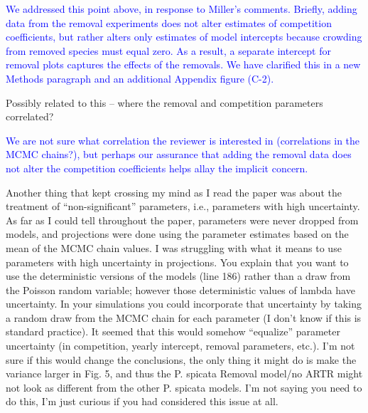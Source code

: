 \documentclass[12pt]{article}
\newcommand{\response}{\textcolor{blue}}
\begin{document}
\response{We addressed this point above, in response to Miller's comments. Briefly, adding data from the removal experiments does not alter estimates of competition coefficients, but rather alters only estimates of model intercepts because crowding from removed species must equal zero. As a result, a separate intercept for removal plots captures the effects of the removals. We have clarified this in a new Methods paragraph and an additional Appendix figure (C-2).}

Possibly related to this – where the removal and competition parameters correlated?

\response{We are not sure what correlation the reviewer is interested in 
(correlations in the MCMC chains?), but perhaps our assurance that
adding the removal data does not alter the competition coefficients 
helps allay the implicit concern.}

Another thing that kept crossing my mind as I read the paper was about the treatment of “non-significant” parameters, i.e., parameters with high uncertainty. As far as I could tell throughout the paper, parameters were never dropped from models, and projections were done using the parameter estimates based on the mean of the MCMC chain values. I was struggling with what it means to use parameters with high uncertainty in projections. You explain that you want to use the deterministic versions of the models (line 186) rather than a draw from the Poisson random variable; however those deterministic values of lambda have uncertainty. In your simulations you could incorporate that uncertainty by taking a random draw from the MCMC chain for each parameter (I don't know if this is standard practice). It seemed that this would somehow “equalize” parameter uncertainty (in competition, yearly intercept, removal parameters, etc.). I'm not sure if this would change the conclusions, the only thing it might do is make the variance larger in Fig. 5, and thus the P. spicata Removal model/no ARTR might not look as different from the other P. spicata models. I'm not saying you need to do this, I'm just curious if you had considered this issue at all.
\end{document}
